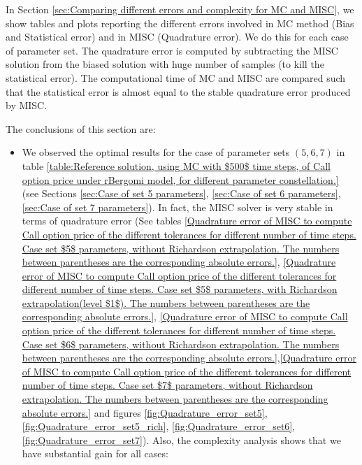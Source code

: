 \documentclass[11pt]{article}
\begin{document}
In Section \ref{sec:Comparing different  errors and complexity for MC and MISC}, we show tables and plots reporting  the different errors involved in MC method (Bias and Statistical error) and in MISC (Quadrature error). We do this for each case of parameter set. The quadrature error is computed by subtracting the MISC solution from the biased solution with huge number of samples (to kill the statistical error). The computational time of MC and MISC are compared such that the statistical error is almost equal to the stable quadrature error produced by MISC.

 The conclusions of this section are: 

\begin{itemize}
	\item We observed the optimal results for the case of parameter sets $(5,6, 7)$ in table \ref{table:Reference solution, using MC with $500$ time steps, of Call option price under rBergomi model, for different parameter constellation.} (see Sections \ref{sec:Case of set 5 parameters}, \ref{sec:Case of set 6 parameters},\ref{sec:Case of set 7 parameters}). In fact, the MISC solver is very stable in terms of quadrature error (See tables \ref{Quadrature error of MISC to compute Call option price of the different tolerances for different number of time steps. Case  set $5$ parameters, without Richardson extrapolation. The numbers between parentheses are the corresponding absolute errors.}, \ref{Quadrature error of MISC to compute Call option price of the different tolerances for different number of time steps. Case set $5$ parameters, with Richardson extrapolation(level $1$). The numbers between parentheses are the corresponding absolute errors.}, \ref{Quadrature error of MISC to compute Call option price of the different tolerances for different number of time steps. Case  set $6$ parameters, without Richardson extrapolation. The numbers between parentheses are the corresponding absolute errors.},\ref{Quadrature error of MISC to compute Call option price of the different tolerances for different number of time steps. Case  set $7$ parameters, without Richardson extrapolation. The numbers between parentheses are the corresponding absolute errors.} and figures \ref{fig:Quadrature_error_set5}, \ref{fig:Quadrature_error_set5_rich}, \ref{fig:Quadrature_error_set6},\ref{fig:Quadrature_error_set7}). Also, the complexity analysis shows that we have substantial gain for all cases:
	\begin{enumerate}

\end{enumerate}
\end{itemize}
\end{document}
